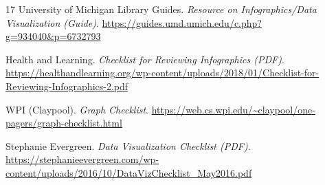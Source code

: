 \documentclass[11pt]{article}
\begin{document}
\begin{thebibliography}{17}
University of Michigan Library Guides. \emph{Resource on Infographics/Data Visualization (Guide)}.
\url{https://guides.umd.umich.edu/c.php?g=934040&p=6732793}

Health and Learning. \emph{Checklist for Reviewing Infographics (PDF)}.
\url{https://healthandlearning.org/wp-content/uploads/2018/01/Checklist-for-Reviewing-Infographics-2.pdf}

WPI (Claypool). \emph{Graph Checklist}.
\url{https://web.cs.wpi.edu/~claypool/one-pagers/graph-checklist.html}

Stephanie Evergreen. \emph{Data Visualization Checklist (PDF)}.
\url{https://stephanieevergreen.com/wp-content/uploads/2016/10/DataVizChecklist_May2016.pdf}

\end{thebibliography}
\end{document}
